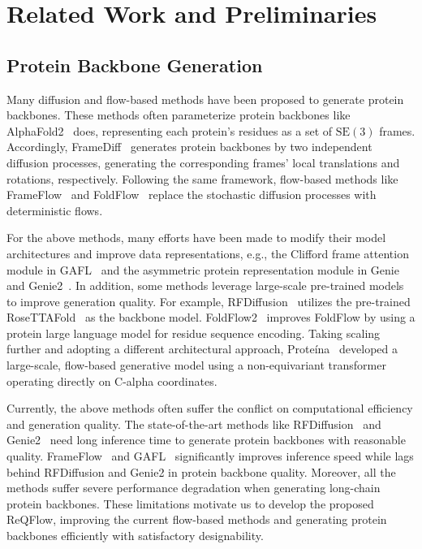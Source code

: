 \section{Related Work and Preliminaries}
\subsection{Protein Backbone Generation}
Many diffusion and flow-based methods have been proposed to generate protein backbones. 
These methods often parameterize protein backbones like AlphaFold2~\cite{jumper2021highly} does, representing each protein's residues as a set of $\text{SE}(3)$ frames.
Accordingly, FrameDiff~\cite{yim2023se} generates protein backbones by two independent diffusion processes, generating the corresponding frames' local translations and rotations, respectively.
Following the same framework, flow-based methods like FrameFlow~\cite{yim2023fast} and FoldFlow~\cite{bose2023se} replace the stochastic diffusion processes with deterministic flows. 

For the above methods, many efforts have been made to modify their model architectures and improve data representations, e.g., the Clifford frame attention module in GAFL~\cite{wagner2024generating} and the asymmetric protein representation module in Genie~\cite{lin2023generating} and Genie2~\cite{lin2024out}. 
In addition, some methods leverage large-scale pre-trained models to improve generation quality.
For example, RFDiffusion~\cite{watson2023novo} utilizes the pre-trained RoseTTAFold~\cite{baek2021accurate} as the backbone model.
FoldFlow2~\cite{huguet2024sequence} improves FoldFlow by using a protein large language model for residue sequence encoding. Taking scaling further and adopting a different architectural approach, Prote\'{i}na~\cite{geffner2025proteina} developed a large-scale, flow-based generative model using a non-equivariant transformer operating directly on C-alpha coordinates.

Currently, the above methods often suffer the conflict on computational efficiency and generation quality.
The state-of-the-art methods like RFDiffusion~\cite{watson2023novo} and Genie2~\cite{lin2024out} need long inference time to generate protein backbones with reasonable quality.
FrameFlow~\cite{yim2023fast} and GAFL~\cite{wagner2024generating} significantly improves inference speed while lags behind RFDiffusion and Genie2 in protein backbone quality. 
Moreover, all the methods suffer severe performance degradation when generating long-chain protein backbones. 
These limitations motivate us to develop the proposed ReQFlow, improving the current flow-based methods and generating protein backbones efficiently with satisfactory designability.




